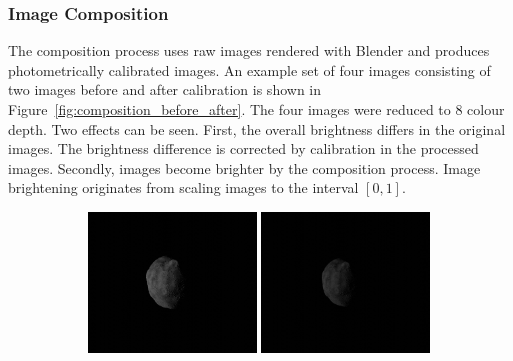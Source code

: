 \subsubsection{Image Composition}
The composition process uses raw images rendered with Blender and produces photometrically calibrated images. An example set of four images consisting of two images before and after calibration is shown in Figure~\ref{fig:composition_before_after}. The four images were reduced to \SI{8}{\bit} colour depth. Two effects can be seen. First, the overall brightness differs in the original images. The brightness difference is corrected by calibration in the processed images. Secondly, images become brighter by the composition process. Image brightening originates from scaling images to the interval $[0,1]$.

\begin{figure}[htb]
    \centering
    \begin{subfigure}[b]{\textwidth}
        \centering
        \includegraphics[width=0.49\textwidth]{doc/thesis/0_figures/rendering_lighting/SssbOnly_2017-08-15T115858-281000.jpg}
        \includegraphics[width=0.49\textwidth]{doc/thesis/0_figures/rendering_lighting/SssbOnly_2017-08-15T115859-288000.jpg}
    \end{subfigure}
    \\
    \begin{subfigure}[b]{\textwidth}

\end{subfigure}
\end{figure}
